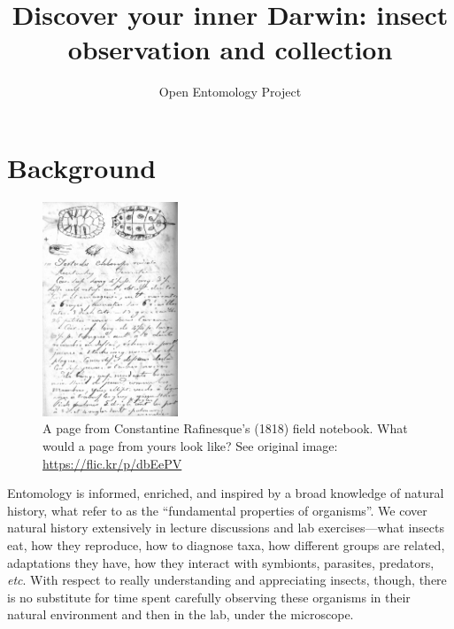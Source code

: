 \documentclass[letterpaper, 11pt]{article}
\title{Discover your inner Darwin: insect observation and collection}
\author{Open Entomology Project}
\begin{document}
\cleanlookdateon %
\maketitle
\thispagestyle{fancy}

\section*{Background}
\begin{figure}
  \vspace{-24pt}
  \begin{center}
    \includegraphics[width=0.36\textwidth]{Rafinesque}%
  \end{center}
  \vspace{-17pt}
  \caption{A page from Constantine Rafinesque's (1818) field notebook. What would a page from yours look like? See original image: \url{https://flic.kr/p/dbEePV}}
  \vspace{-30pt}
\end{figure}

Entomology is informed, enriched, and inspired by a broad knowledge of natural history, what \cite{Tewksbury01042014} refer to as the ``fundamental properties of organisms''. We cover natural history extensively in lecture discussions and lab exercises---what insects eat, how they reproduce, how to diagnose taxa, how different groups are related, adaptations they have, how they interact with symbionts, parasites, predators, \textit{etc}. With respect to really understanding and appreciating insects, though, there is no substitute for time spent carefully observing these organisms in their natural environment and then in the lab, under the microscope. \\
\end{document}

